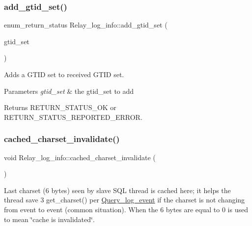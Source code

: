 \subsubsection{\texorpdfstring{add\+\_\+gtid\+\_\+set()}{add\_gtid\_set()}}
{\footnotesize\ttfamily enum\+\_\+return\+\_\+status Relay\+\_\+log\+\_\+info\+::add\+\_\+gtid\+\_\+set (\begin{DoxyParamCaption}\item[{const \mbox{\hyperlink{classGtid__set}{Gtid\+\_\+set}} $\ast$}]{gtid\+\_\+set }\end{DoxyParamCaption})}

Adds a G\+T\+ID set to received G\+T\+ID set.


\begin{DoxyParams}{Parameters}
{\em gtid\+\_\+set} & the gtid\+\_\+set to add\\
\hline
\end{DoxyParams}
\begin{DoxyReturn}{Returns}
R\+E\+T\+U\+R\+N\+\_\+\+S\+T\+A\+T\+U\+S\+\_\+\+OK or R\+E\+T\+U\+R\+N\+\_\+\+S\+T\+A\+T\+U\+S\+\_\+\+R\+E\+P\+O\+R\+T\+E\+D\+\_\+\+E\+R\+R\+OR. 
\end{DoxyReturn}
\mbox{\label{classRelay__log__info_a629b920b6fd672668c9028cd1d4b064e}} 
\subsubsection{\texorpdfstring{cached\+\_\+charset\+\_\+invalidate()}{cached\_charset\_invalidate()}}
{\footnotesize\ttfamily void Relay\+\_\+log\+\_\+info\+::cached\+\_\+charset\+\_\+invalidate (\begin{DoxyParamCaption}{ }\end{DoxyParamCaption})}

Last charset (6 bytes) seen by slave S\+QL thread is cached here; it helps the thread save 3 {\ttfamily get\+\_\+charset()} per {\ttfamily \mbox{\hyperlink{classQuery__log__event}{Query\+\_\+log\+\_\+event}}} if the charset is not changing from event to event (common situation). When the 6 bytes are equal to 0 is used to mean \char`\"{}cache is invalidated\char`\"{}. \mbox{\label{classRelay__log__info_a7fa497a605d2730224ade21a3344f15c}} 
